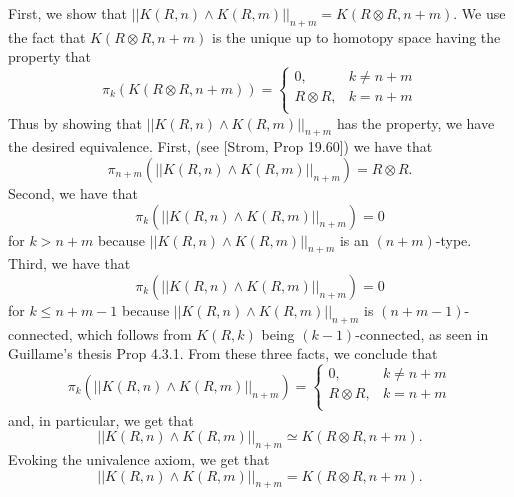\documentclass[12pt]{amsart}
\theoremstyle{remark}
\theoremstyle{definition}
\begin{document}
First, we show that
$ || K(R,n) \wedge K(R,m) ||_{n+m} = K( R \otimes R, n+m )
$. We use the fact that $K (R \otimes R, n+m )$ is the unique up to homotopy space
having the property that
\[
  \pi_k (K(R \otimes R, n+m )) =
  \begin{cases}
    0, & k \neq n+m \\
    R \otimes R, & k= n+m \\
  \end{cases}
\]
Thus by showing that $ || K(R,n) \wedge K(R,m) ||_{n+m} $
has the property, we have the desired
equivalence. First, (see [Strom, Prop 19.60]) we have that
\[
  \pi_{n+m} ( || K(R,n) \wedge K(R,m) ||_{n+m} )
  = R \otimes R.
\]
Second, we have that
\[
  \pi_k ( || K(R,n) \wedge K(R,m) ||_{n+m} )
  = 0
\]
for $ k > n+m $ because $ || K(R,n) \wedge K(R,m) ||_{n+m} $
is an $ ( n+m ) $-type. Third, we have that 
\[
  \pi_k (|| K(R,n) \wedge K(R,m) ||_{n+m} ) = 0
\]
for $ k \leq n+m-1 $ because
$ || K(R,n) \wedge K(R,m) ||_{n+m} $ is
$ ( n+m-1 ) $-connected, which follows from $ K( R,k ) $ being
$ ( k-1 ) $-connected, as seen in Guillame's
thesis Prop 4.3.1. From these three facts, we conclude that
\[
  \pi_k (|| K(R,n) \wedge K(R,m) ||_{n+m}) =
  \begin{cases}
    0, & k \neq n+m \\
    R \otimes R, & k= n+m \\
  \end{cases}
\]
and, in particular, we get that
\[
  || K(R,n) \wedge K(R,m) ||_{n+m} \simeq
  K (R \otimes R, n+m ).
\]
Evoking the univalence axiom, we get that
\[
  || K(R,n) \wedge K(R,m) ||_{n+m} =
  K (R \otimes R, n+m ).
\]
\end{document}
